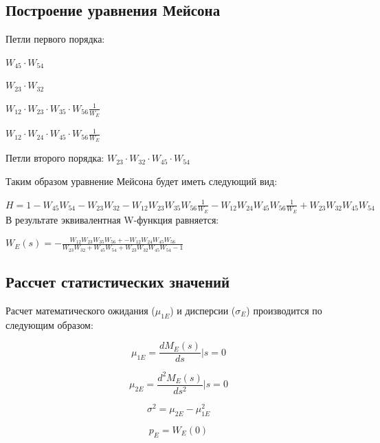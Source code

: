 \documentclass[14pt,a4paper,report]{report}
\begin{document}
\subsection{Построение уравнения Мейсона}

Петли первого порядка:

$W_{45}\cdot W_{54}$

$W_{23}\cdot W_{32}$

$W_{12}\cdot W_{23}\cdot W_{35}\cdot W_{56}\frac{1}{W_E}$

$W_{12}\cdot W_{24}\cdot W_{45}\cdot W_{56}\frac{1}{W_E}$

Петли второго порядка:
$W_{23}\cdot W_{32}\cdot W_{45}\cdot W_{54}$

Таким образом уравнение Мейсона будет иметь следующий вид:

$H=1 - W_{45}W_{54}
-W_{23}W_{32}
-W_{12}W_{23}W_{35}W_{56}\frac{1}{W_E}
-W_{12}W_{24}W_{45}W_{56}\frac{1}{W_E}
+W_{23}W_{32}W_{45}W_{54}$\\

В результате эквивалентная W-функция равняется:

$W_E(s)=- \frac{W_{12}W_{23}W_{35}W_{56}+
-W_{12}W_{24}W_{45}W_{56}}
{W_{23}W_{32}
+W_{45}W_{54}
+W_{23}W_{32}W_{45}W_{54}
-1}$\\

\subsection{Рассчет статистических значений}

Расчет математического ожидания ($\mu_{1E}$) и дисперсии ($\sigma_E$) производится по следующим образом:

$$\mu_{1E}=\frac{d M_E(s)}{ds}|s=0$$

$$\mu_{2E}=\frac{d^2 M_E(s)}{ds^2}|s=0$$

$$\sigma^2=\mu_{2E}-\mu_{1E}^2$$

$$ p_E=W_E(0)$$
\end{document}
